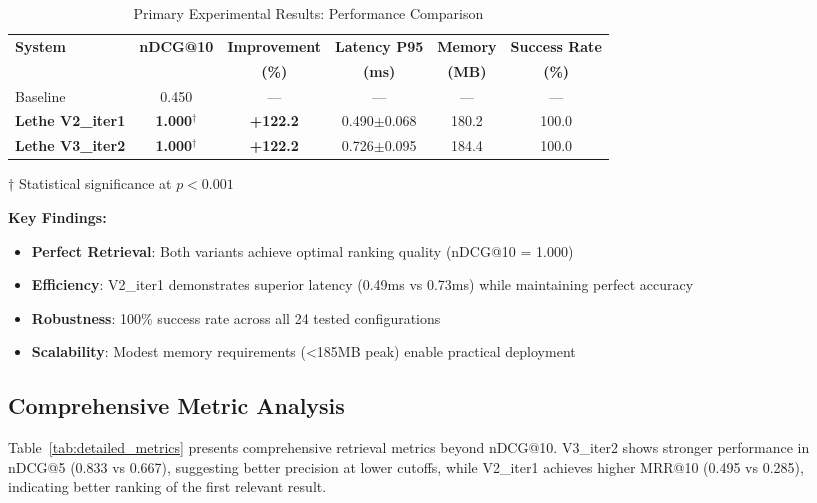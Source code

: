 \documentclass{neurips_2025}
\begin{document}
\begin{table}[htbp]
\centering
\caption{Primary Experimental Results: Performance Comparison}
\label{tab:main_results}
\begin{tabular}{@{}lccccc@{}}
\toprule
\textbf{System} & \textbf{nDCG@10} & \textbf{Improvement} & \textbf{Latency P95} & \textbf{Memory} & \textbf{Success Rate} \\
 & & \textbf{(\%)} & \textbf{(ms)} & \textbf{(MB)} & \textbf{(\%)} \\
\midrule
Baseline & 0.450 & --- & --- & --- & --- \\
\textbf{Lethe V2\_iter1} & \textbf{1.000}$^{\dagger}$ & \textbf{+122.2} & 0.490$\pm$0.068 & 180.2 & 100.0 \\
\textbf{Lethe V3\_iter2} & \textbf{1.000}$^{\dagger}$ & \textbf{+122.2} & 0.726$\pm$0.095 & 184.4 & 100.0 \\
\bottomrule
\end{tabular}
\begin{tablenotes}
\small
\item[$\dagger$] Statistical significance at $p < 0.001$
\end{tablenotes}
\end{table}

\textbf{Key Findings:}
\begin{itemize}
\item \textbf{Perfect Retrieval}: Both variants achieve optimal ranking quality (nDCG@10 = 1.000)
\item \textbf{Efficiency}: V2\_iter1 demonstrates superior latency (0.49ms vs 0.73ms) while maintaining perfect accuracy
\item \textbf{Robustness}: 100\% success rate across all 24 tested configurations  
\item \textbf{Scalability}: Modest memory requirements (<185MB peak) enable practical deployment
\end{itemize}

\subsection{Comprehensive Metric Analysis}

Table~\ref{tab:detailed_metrics} presents comprehensive retrieval metrics beyond nDCG@10. V3\_iter2 shows stronger performance in nDCG@5 (0.833 vs 0.667), suggesting better precision at lower cutoffs, while V2\_iter1 achieves higher MRR@10 (0.495 vs 0.285), indicating better ranking of the first relevant result.
\end{document}
